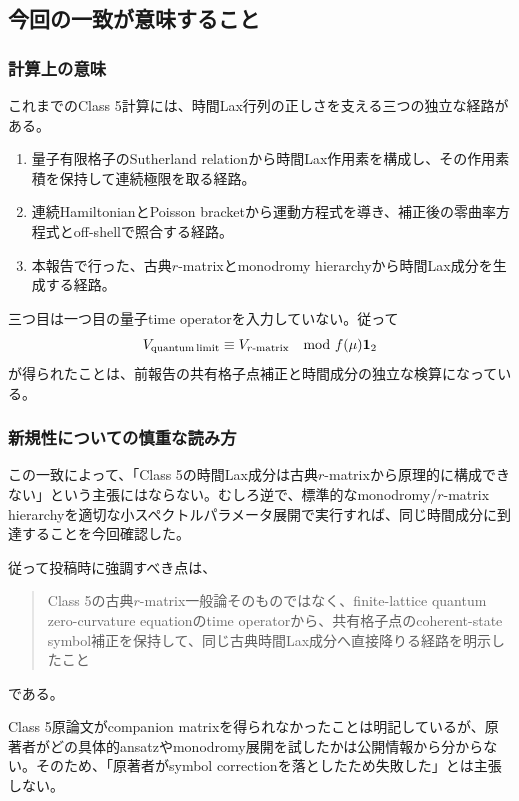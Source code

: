 \subsection{今回の一致が意味すること}

\subsubsection{計算上の意味}

これまでのClass 5計算には、時間Lax行列の正しさを支える三つの独立な経路がある。
\begin{enumerate}
\item 量子有限格子のSutherland relationから時間Lax作用素を構成し、その作用素積を保持して連続極限を取る経路。
\item 連続HamiltonianとPoisson bracketから運動方程式を導き、補正後の零曲率方程式とoff-shellで照合する経路。
\item 本報告で行った、古典$r$-matrixとmonodromy hierarchyから時間Lax成分を生成する経路。
\end{enumerate}

三つ目は一つ目の量子time operatorを入力していない。従って
\begin{equation}
V_{\rm quantum\,limit}
\equiv
V_{r\text{-matrix}}
\quad
\text{mod }f(\mu)\mathbf 1_2
\label{audit5r:eq:bridgeclosed}
\end{equation}
が得られたことは、前報告の共有格子点補正と時間成分の独立な検算になっている。

\subsubsection{新規性についての慎重な読み方}

この一致によって、「Class 5の時間Lax成分は古典$r$-matrixから原理的に構成できない」という主張にはならない。むしろ逆で、標準的なmonodromy/$r$-matrix hierarchyを適切な小スペクトルパラメータ展開で実行すれば、同じ時間成分に到達することを今回確認した。

従って投稿時に強調すべき点は、
\begin{quote}
Class 5の古典$r$-matrix一般論そのものではなく、finite-lattice quantum zero-curvature equationのtime operatorから、共有格子点のcoherent-state symbol補正を保持して、同じ古典時間Lax成分へ直接降りる経路を明示したこと
\end{quote}
である。

Class 5原論文がcompanion matrixを得られなかったことは明記している\cite{DFN}が、原著者がどの具体的ansatzやmonodromy展開を試したかは公開情報から分からない。そのため、「原著者がsymbol correctionを落としたため失敗した」とは主張しない。

